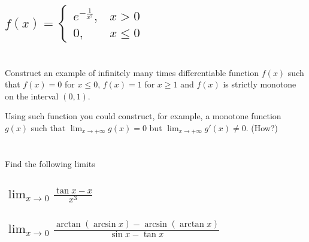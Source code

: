 \documentclass[]{article}
\begin{document}
\subsection{
    $f(x) =
    \begin{cases}
        e^{-\frac{1}{x^2}}, &x > 0\\
        0,                  &x \leq 0
    \end{cases}$
}




\newpage
\section{}
Construct an example of infinitely many times differentiable function $f(x)$ such that $f(x) = 0$ for $x \leq 0$, $f(x) = 1$ for $x \geq 1$ and $f(x)$ is strictly monotone on the interval $(0,1)$.

Using such function you could construct, for example, a monotone function $g(x)$ such that $\lim_{x \to +\infty} g(x) = 0$ but $\lim_{x \to +\infty} g'(x) \neq 0$. (How?)




















\newpage
\section{}
Find the following limits

\subsection{
    $\lim_{x \to 0} \frac{\tan{x} - x}{x^3}$
}









\subsection{
    $\lim_{x \to 0} \frac{\arctan(\arcsin{x}) - \arcsin(\arctan{x})}{\sin{x} - \tan{x}}$
}
\end{document}
